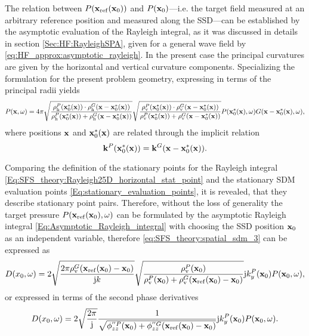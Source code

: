 The relation between $P(\mathbf{x}_{\mathrm{ref}}(\mathbf{x}_0))$ and $P(\mathbf{x}_0)$---i.e. the target field measured at an arbitrary reference position and measured along the SSD---can be established by the asymptotic evaluation of the Rayleigh integral, as it was discussed in details in section \ref{Sec:HF:RayleighSPA}, given for a general wave field by \eqref{eq:HF_approx:asymptotic_rayleigh}.
In the present case the principal curvatures are given by the horizontal and vertical curvature components.
Specializing the formulation for the present problem geometry, expressing in terms of the principal radii yields
\begin{equation}
\label{Eq:Asymptotic_Rayleigh_integral}
\footnotesize
P(\mathbf{x},\omega) = 4\pi
\sqrt{\frac{\rho_\mathrm{h}^P(\mathbf{x}_0^*(\mathbf{x})) \cdot \rho_\mathrm{h}^G(\mathbf{x}-\mathbf{x}_0^*(\mathbf{x}))}{\rho_\mathrm{h}^P(\mathbf{x}_0^*(\mathbf{x})) + \rho_\mathrm{h}^G(\mathbf{x}-\mathbf{x}_0^*(\mathbf{x}))}}
\sqrt{\frac{\rho_\mathrm{v}^P(\mathbf{x}_0^*(\mathbf{x})) \cdot \rho_\mathrm{v}^G(\mathbf{x}-\mathbf{x}_0^*(\mathbf{x}))}{\rho_\mathrm{v}^P(\mathbf{x}_0^*(\mathbf{x})) + \rho_\mathrm{v}^G(\mathbf{x}-\mathbf{x}_0^*(\mathbf{x}))}}
P(\mathbf{x}_0^*(\mathbf{x}),\omega) G(\mathbf{x}-\mathbf{x}_0^*(\mathbf{x}),\omega)
,
\end{equation}
where positions $\mathbf{x}$ and $\mathbf{x}_0^*(\mathbf{x})$ are related through the implicit relation
\begin{equation}
\label{Eq:SFS_theory:Rayleigh25D_horizontal_stat_point}
\mathbf{k}^P(\mathbf{x}_0^*(\mathbf{x})) = \mathbf{k}^G( \mathbf{x} - \mathbf{x}_0^*(\mathbf{x})).
\end{equation}

Comparing the definition of the stationary points for the Rayleigh integral \eqref{Eq:SFS_theory:Rayleigh25D_horizontal_stat_point} and the stationary SDM evaluation points \eqref{Eq:stationary_evaluation_points}, it is revealed, that they describe stationary point pairs.
Therefore, without the loss of generality the target pressure $P(\mathbf{x}_{\mathrm{ref}}(\mathbf{x}_0),\omega)$ can be formulated by the asymptotic Rayleigh integral \eqref{Eq:Asymptotic_Rayleigh_integral} with choosing the SSD position $\mathbf{x}_0$ as an independent variable, therefore \eqref{eq:SFS_theory:spatial_sdm_3} can be expressed as
\begin{equation}
D(x_0,\omega) =
\small
2\sqrt{\frac{2\pi  \rho_\mathrm{v}^G(\mathbf{x}_{\mathrm{ref}}(\mathbf{x}_0)-\mathbf{x}_0)}{\mathrm{j} k}} 
\sqrt{\frac{\rho_\mathrm{v}^P(\mathbf{x}_0) }{\rho_\mathrm{v}^P(\mathbf{x}_0) + \rho_\mathrm{v}^G(\mathbf{x}_{\mathrm{ref}}(\mathbf{x}_0)-\mathbf{x}_0)}}
\mathrm{j} k_y^{P}(\mathbf{x}_0)
P(\mathbf{x}_0,\omega),
\end{equation}
or expressed in terms of the second phase derivatives 
\begin{equation}
D(x_0,\omega) =
\small
2\sqrt{\frac{2\pi }{\mathrm{j} }} 
\frac{ 1 }{\sqrt{\phi^{''P}_{zz}(\mathbf{x}_0) + \phi^{''G}_{zz}(\mathbf{x}_{\mathrm{ref}}(\mathbf{x}_0)-\mathbf{x}_0)}}
\mathrm{j} k_y^{P}(\mathbf{x}_0)
P(\mathbf{x}_0,\omega).
\end{equation}

